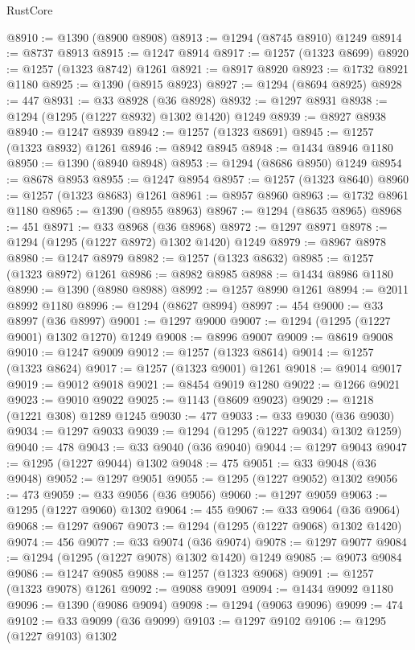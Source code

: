 \begin{lexlean}{RustCore}
\begin{coremodule}
@8910 := @1390 (@8900 @8908)
@8913 := @1294 (@8745 @8910) @1249
@8914 := @8737 @8913
@8915 := @1247 @8914
@8917 := @1257 (@1323 @8699)
@8920 := @1257 (@1323 @8742) @1261
@8921 := @8917 @8920
@8923 := @1732 @8921 @1180
@8925 := @1390 (@8915 @8923)
@8927 := @1294 (@8694 @8925)
@8928 := 447
@8931 := @33 @8928 (@36 @8928)
@8932 := @1297 @8931
@8938 := @1294 (@1295 (@1227 @8932) @1302 @1420) @1249
@8939 := @8927 @8938
@8940 := @1247 @8939
@8942 := @1257 (@1323 @8691)
@8945 := @1257 (@1323 @8932) @1261
@8946 := @8942 @8945
@8948 := @1434 @8946 @1180
@8950 := @1390 (@8940 @8948)
@8953 := @1294 (@8686 @8950) @1249
@8954 := @8678 @8953
@8955 := @1247 @8954
@8957 := @1257 (@1323 @8640)
@8960 := @1257 (@1323 @8683) @1261
@8961 := @8957 @8960
@8963 := @1732 @8961 @1180
@8965 := @1390 (@8955 @8963)
@8967 := @1294 (@8635 @8965)
@8968 := 451
@8971 := @33 @8968 (@36 @8968)
@8972 := @1297 @8971
@8978 := @1294 (@1295 (@1227 @8972) @1302 @1420) @1249
@8979 := @8967 @8978
@8980 := @1247 @8979
@8982 := @1257 (@1323 @8632)
@8985 := @1257 (@1323 @8972) @1261
@8986 := @8982 @8985
@8988 := @1434 @8986 @1180
@8990 := @1390 (@8980 @8988)
@8992 := @1257 @8990 @1261
@8994 := @2011 @8992 @1180
@8996 := @1294 (@8627 @8994)
@8997 := 454
@9000 := @33 @8997 (@36 @8997)
@9001 := @1297 @9000
@9007 := @1294 (@1295 (@1227 @9001) @1302 @1270) @1249
@9008 := @8996 @9007
@9009 := @8619 @9008
@9010 := @1247 @9009
@9012 := @1257 (@1323 @8614)
@9014 := @1257 (@1323 @8624)
@9017 := @1257 (@1323 @9001) @1261
@9018 := @9014 @9017
@9019 := @9012 @9018
@9021 := @8454 @9019 @1280
@9022 := @1266 @9021
@9023 := @9010 @9022
@9025 := @1143 (@8609 @9023)
@9029 := @1218 (@1221 @308) @1289 @1245
@9030 := 477
@9033 := @33 @9030 (@36 @9030)
@9034 := @1297 @9033
@9039 := @1294 (@1295 (@1227 @9034) @1302 @1259)
@9040 := 478
@9043 := @33 @9040 (@36 @9040)
@9044 := @1297 @9043
@9047 := @1295 (@1227 @9044) @1302
@9048 := 475
@9051 := @33 @9048 (@36 @9048)
@9052 := @1297 @9051
@9055 := @1295 (@1227 @9052) @1302
@9056 := 473
@9059 := @33 @9056 (@36 @9056)
@9060 := @1297 @9059
@9063 := @1295 (@1227 @9060) @1302
@9064 := 455
@9067 := @33 @9064 (@36 @9064)
@9068 := @1297 @9067
@9073 := @1294 (@1295 (@1227 @9068) @1302 @1420)
@9074 := 456
@9077 := @33 @9074 (@36 @9074)
@9078 := @1297 @9077
@9084 := @1294 (@1295 (@1227 @9078) @1302 @1420) @1249
@9085 := @9073 @9084
@9086 := @1247 @9085
@9088 := @1257 (@1323 @9068)
@9091 := @1257 (@1323 @9078) @1261
@9092 := @9088 @9091
@9094 := @1434 @9092 @1180
@9096 := @1390 (@9086 @9094)
@9098 := @1294 (@9063 @9096)
@9099 := 474
@9102 := @33 @9099 (@36 @9099)
@9103 := @1297 @9102
@9106 := @1295 (@1227 @9103) @1302

\end{coremodule}
\end{lexlean}
